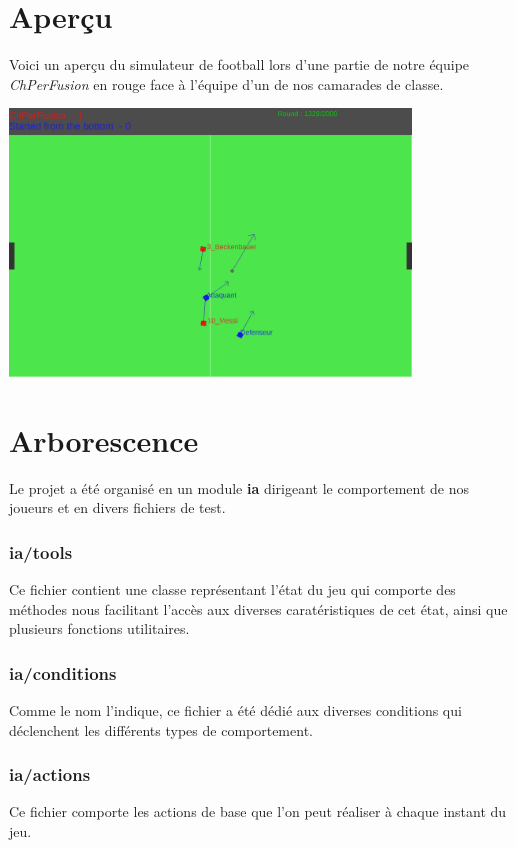 \documentclass[12pt,a4paper]{article}
\begin{document}
\section*{Aper\c{c}u}
Voici un aper\c{c}u du simulateur de football lors d'une partie de notre 
\'equipe {\itshape ChPerFusion} en rouge face \`a l'\'equipe d'un de nos 
camarades de classe.

\begin{center}
\includegraphics[width=0.8\textwidth]{apercu.png}\par%
\end{center}

\section*{Arborescence}
Le projet a \'et\'e organis\'e en un module {\bfseries ia} dirigeant le 
comportement de nos joueurs et en divers fichiers de test.
\subsubsection*{ia/tools}
Ce fichier contient une classe repr\'esentant l'\'etat du jeu qui comporte des 
m\'ethodes nous facilitant l'acc\`es aux diverses carat\'eristiques de cet 
\'etat, ainsi que plusieurs fonctions utilitaires.

\subsubsection*{ia/conditions}
Comme le nom l'indique, ce fichier a \'et\'e d\'edi\'e aux diverses conditions 
qui d\'eclenchent les diff\'erents types de comportement.

\subsubsection*{ia/actions}
Ce fichier comporte les actions de base que l'on peut r\'ealiser \`a chaque 
instant du jeu.
\end{document}
